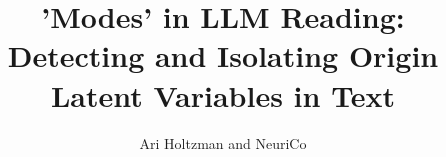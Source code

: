 \documentclass{article}
\title{'Modes' in LLM Reading: Detecting and Isolating Origin Latent Variables in Text}
\author{Ari Holtzman and NeuriCo}
\begin{document}
\maketitle

\begin{abstract}

\end{abstract}










\newpage

\end{document}
